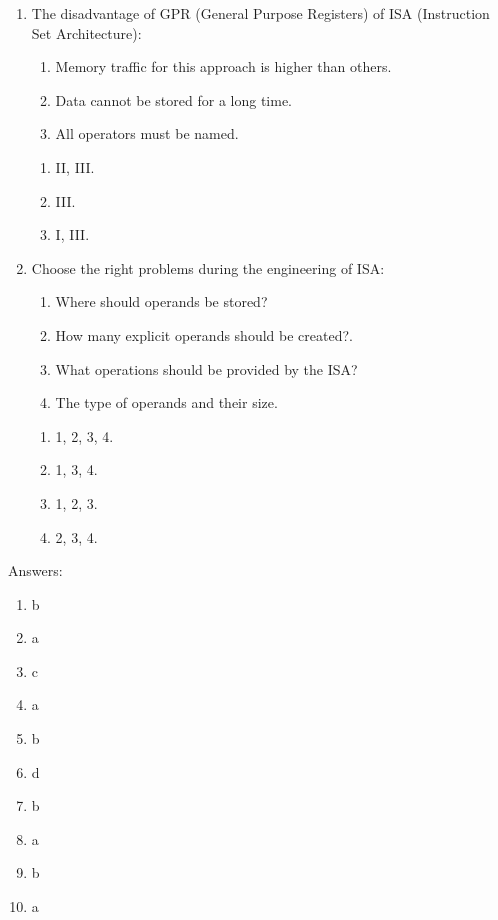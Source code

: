 \documentclass[paper=8.2in:11.6in]{scrartcl}
\begin{document}
\begin{enumerate}
\begin{enumerate}[label=\alph*)]
\end{enumerate}

\item The disadvantage of GPR (General Purpose Registers) of ISA (Instruction Set Architecture):

\begin{enumerate}[label=\Roman*.]

\item Memory traffic for this approach is higher than others.
\item Data cannot be stored for a long time.
\item All operators must be named.

\end{enumerate}

\begin{enumerate}[label=\alph*)]

\item II, III.
\item III.
\item I, III.

\end{enumerate}

\item Choose the right problems during the engineering of ISA:

\begin{enumerate}[label=\arabic*.]

\item Where should operands be stored?
\item How many explicit operands should be created?.
\item What operations should be provided by the ISA?
\item The type of operands and their size.

\end{enumerate}

\begin{enumerate}[label=\alph*)]

\item 1, 2, 3, 4.
\item 1, 3, 4.
\item 1, 2, 3.
\item 2, 3, 4.

\end{enumerate}

\end{enumerate}

\newpage


Answers:

\begin{enumerate}

\item b
\item a
\item c
\item a
\item b
\item d
\item b
\item a
\item b
\item a

\end{enumerate}
\end{document}
